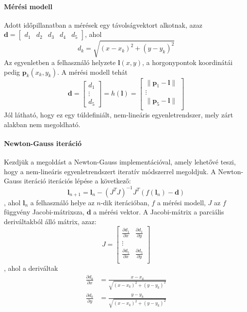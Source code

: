\begin{answer}
	\paragraph{Mérési modell}
	Adott időpillanatban a mérések egy távolságvektort alkotnak, azaz $\mathbf{d}=\begin{bmatrix}d_1 & d_2 & d_3 & d_4 & d_5\end{bmatrix}$, ahol 
	\begin{equation*}
		d_k=\sqrt{(x-x_k)^2+(y-y_k)^2}
	\end{equation*}
	Az egyenletben a felhasználó helyzete $\mathbf{l}(x,y)$, a horgonypontok koordinátái pedig $\mathbf{p}_k(x_k,y_k)$. A mérési modell tehát
	\begin{equation*}
	\mathbf{d} = \begin{bmatrix}
	d_1 \\ \vdots \\ d_5
	\end{bmatrix} =
    h(\mathbf{l})  =
	\begin{bmatrix}
		\|\mathbf{p}_1 - \mathbf{l}\| \\
		\vdots \\
		\|\mathbf{p}_5 - \mathbf{l}\| \\
	\end{bmatrix}
	\end{equation*}
	Jól látható, hogy ez egy túldefiniált, nem-lineáris egyenletrendszer, mely zárt alakban nem megoldható.
	
	\paragraph{Newton-Gauss iteráció}
	Kezdjük a megoldást a Newton-Gauss implementációval, amely lehetővé teszi, hogy a nem-lineáris egyenletrendszert iteratív módszerrel megoldjuk. A Newton-Gauss iteráció iterációs lépése a következő:
	\begin{equation*}
		\mathbf{l}_{n+1}=\mathbf{l}_{n}-(J^T J)^{-1} J^T (f(\mathbf{l}_n) - \mathbf{d})
	\end{equation*}
	, ahol $\mathbf{l}_{n}$ a felhasználó helye az $n$-dik iterációban, $f$ a mérési modell, $J$ az $f$ függvény Jacobi-mátrixsza, $\mathbf{d}$ a mérési vektor. A Jacobi-mátrix a parciális deriváltakból álló mátrix, azaz:
	\begin{equation*}
	J=\begin{bmatrix}
		\frac{\partial d_1}{\partial x} & 	\frac{\partial d_1}{\partial y} \\
		\vdots \\
		\frac{\partial d_5}{\partial x} & 	\frac{\partial d_5}{\partial y} \\
	\end{bmatrix}
	\end{equation*}
	, ahol a deriváltak
	\begin{equation*}
	\begin{split}
		\frac{\partial d_k}{\partial x}&=\frac{x-x_k}{\sqrt{(x-x_k)^2+(y-y_k)^2}} \\
		\frac{\partial d_k}{\partial y}&=\frac{y-y_k}{\sqrt{(x-x_k)^2+(y-y_k)^2}} \\
	\end{split}
	\end{equation*}
	

\end{answer}
